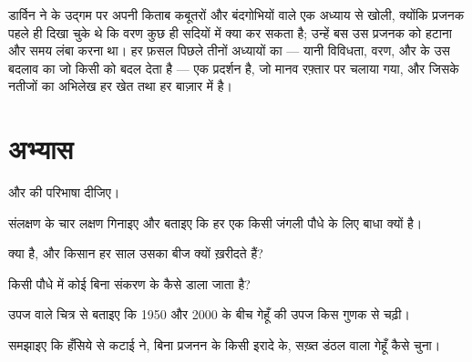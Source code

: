 \begin{remark}[विकास का सबसे पुराना प्रयोग]\label{rem:g12:domesticated-plants:oldest}
डार्विन ने  के उद्गम पर अपनी किताब कबूतरों और बंदगोभियों वाले एक
अध्याय से खोली, क्योंकि प्रजनक पहले ही दिखा चुके थे कि वरण कुछ ही सदियों में
क्या कर सकता है; उन्हें बस उस प्रजनक को हटाना और समय लंबा करना था। हर फ़सल
पिछले तीनों अध्यायों का --- यानी विविधता, वरण, और  के उस बदलाव
का जो किसी  को बदल देता है --- एक प्रदर्शन है, जो मानव रफ़्तार पर चलाया
गया, और जिसके नतीजों का अभिलेख हर खेत तथा हर बाज़ार में है।
\end{remark}

\section{अभ्यास}

\begin{exercise}[$\star$]\label{exo:g12:domesticated-plants:1}
 और  की परिभाषा दीजिए।
\end{exercise}

\begin{exercise}[$\star$]\label{exo:g12:domesticated-plants:2}
 संलक्षण के चार लक्षण गिनाइए और बताइए कि हर एक किसी जंगली पौधे के
लिए बाधा क्यों है।
\end{exercise}

\begin{exercise}[$\star$]\label{exo:g12:domesticated-plants:3}
 क्या है, और किसान हर साल उसका बीज क्यों ख़रीदते हैं?
\end{exercise}

\begin{exercise}[$\star$]\label{exo:g12:domesticated-plants:4}
किसी पौधे में कोई  बिना संकरण के कैसे डाला जाता है?
\end{exercise}

\begin{exercise}[$\star$]\label{exo:g12:domesticated-plants:5}
उपज वाले चित्र से बताइए कि 1950 और 2000 के बीच गेहूँ की उपज किस गुणक से
चढ़ी।
\end{exercise}

\begin{exercise}[$\star\star$]\label{exo:g12:domesticated-plants:6}
समझाइए कि हँसिये से कटाई ने, बिना प्रजनन के किसी इरादे के, सख़्त डंठल वाला
गेहूँ कैसे चुना।
\end{exercise}

